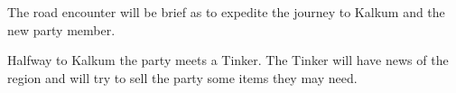 The road encounter will be brief as to expedite the journey to Kalkum and the new party member.

Halfway to Kalkum the party meets a Tinker.
The Tinker will have news of the region and will try to sell the party some items they may need.
